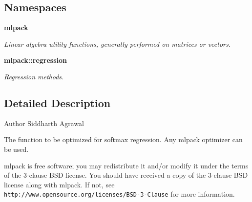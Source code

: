 \subsection*{Namespaces}
\begin{DoxyCompactItemize}
\item 
 \textbf{ mlpack}
\begin{DoxyCompactList}\small\item\em Linear algebra utility functions, generally performed on matrices or vectors. \end{DoxyCompactList}\item 
 \textbf{ mlpack\+::regression}
\begin{DoxyCompactList}\small\item\em Regression methods. \end{DoxyCompactList}\end{DoxyCompactItemize}


\subsection{Detailed Description}
\begin{DoxyAuthor}{Author}
Siddharth Agrawal
\end{DoxyAuthor}
The function to be optimized for softmax regression. Any mlpack optimizer can be used.

mlpack is free software; you may redistribute it and/or modify it under the terms of the 3-\/clause B\+SD license. You should have received a copy of the 3-\/clause B\+SD license along with mlpack. If not, see {\tt http\+://www.\+opensource.\+org/licenses/\+B\+S\+D-\/3-\/\+Clause} for more information. 